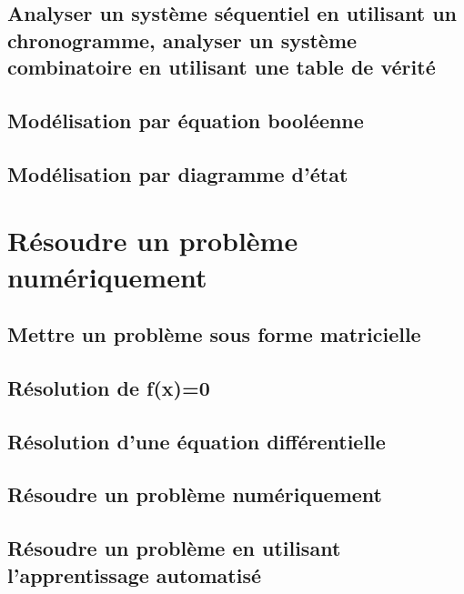\section{Analyser un système séquentiel en utilisant un chronogramme, analyser un système combinatoire en utilisant une table de vérité} 
\section{Modélisation par équation booléenne} 
\section{Modélisation par diagramme d'état} 
\setchapterpreamble[u]{\margintoc} 
\chapter{Résoudre un problème numériquement} 
\section{Mettre un problème sous forme matricielle} 
\section{Résolution de f(x)=0} 
\section{Résolution d'une équation différentielle} 
\section{Résoudre un problème numériquement} 
\section{Résoudre un problème en utilisant l'apprentissage automatisé} 
